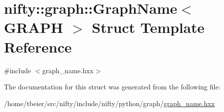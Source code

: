 \hypertarget{structnifty_1_1graph_1_1GraphName}{}\section{nifty\+:\+:graph\+:\+:Graph\+Name$<$ G\+R\+A\+P\+H $>$ Struct Template Reference}
\label{structnifty_1_1graph_1_1GraphName}


{\ttfamily \#include $<$graph\+\_\+name.\+hxx$>$}



The documentation for this struct was generated from the following file\+:\begin{DoxyCompactItemize}
\item 
/home/tbeier/src/nifty/include/nifty/python/graph/\hyperlink{graph__name_8hxx}{graph\+\_\+name.\+hxx}\end{DoxyCompactItemize}
